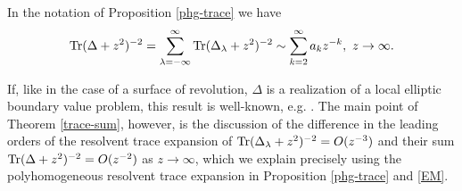 \begin{theorem}\label{trace-sum}
In the notation of Proposition \textup{\ref{phg-trace}} we have
\begin{align}\label{1.15}
\operatorname{Tr}(\Delta+z^2)^{-2} = \sum_{\lambda=-\infty}^{\infty}\operatorname{Tr}(\Delta_\lambda+z^2)^{-2} 
\sim \sum_{k=2}^\infty a_k z^{-k}, \ z \to \infty.
\end{align}
\end{theorem}

If, like in the case of a surface of revolution, $\Delta$ is a realization of a 
local elliptic boundary value problem, this result is well-known, e.g. \cite[Sec. 1.11]{Gil:ITH}.
The main point of Theorem \ref{trace-sum}, however, is the discussion of
the difference in the leading orders of the resolvent trace expansion of 
$\operatorname{Tr}(\Delta_\lambda+z^2)^{-2}=O(z^{-3})$ and their sum $\operatorname{Tr}(\Delta+z^2)^{-2}=O(z^{-2})$
as $z \to \infty$, which we explain precisely using the polyhomogeneous resolvent trace expansion 
in Proposition \ref{phg-trace} and \eqref{EM}.

